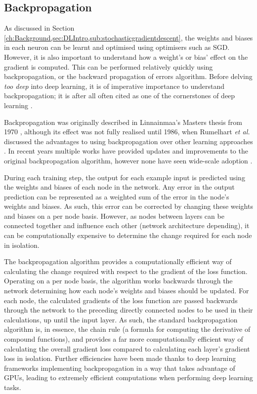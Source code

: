 \subsection{Backpropagation}\label{ch:Background,sec:DLIntro,sub:backprop}

As discussed in Section \ref{ch:Background,sec:DLIntro,sub:stochasticgradientdescent}, the weights and biases in each neuron can be learnt and optimised using optimisers such as SGD. However, it is also important to understand how a weight's or bias' effect on the gradient is computed. This can be performed relatively quickly using backpropagation, or the backward propagation of errors algorithm. Before delving \textit{too deep} into deep learning, it is of imperative importance to understand backpropagation; it is after all often cited as one of the cornerstones of deep learning \cite{alber_backprop_2018}.

Backpropagation was originally described in Linnainmaa's Masters thesis from 1970 \cite{linnainmaa_representation_1970}, although its effect was not fully realised until 1986, when Rumelhart \textit{et al.} discussed the advantages to using backpropagation over other learning approaches \cite{rumelhart_learning_1986}. In recent years multiple works have provided updates and improvements to the original backpropagation algorithm, however none have seen wide-scale adoption \cite{bengio_use_1994, lillicrap_random_2014, lee_difference_2015, nokland_direct_2016, liao_how_2016}. 

During each training step, the output for each example input is predicted using the weights and biases of each node in the network. Any error in the output prediction can be represented as a weighted sum of the error in the node's weights and biases. As such, this error can be corrected by changing these weights and biases on a per node basis. However, as nodes between layers can be connected together and influence each other (network architecture depending), it can be computationally expensive to determine the change required for each node in isolation.

The backpropagation algorithm provides a computationally efficient way of calculating the change required with respect to the gradient of the loss function. Operating on a per node basis, the algorithm works backwards through the network determining how each node's weights and biases should be updated. For each node, the calculated gradients of the loss function are passed backwards through the network to the preceding directly connected nodes to be used in their calculations, up until the input layer. As such, the standard backpropagation algorithm is, in essence, the chain rule (a formula for computing the derivative of compound functions), and provides a far more computationally efficient way of calculating the overall gradient loss compared to calculating each layer's gradient loss in isolation. Further efficiencies have been made thanks to deep learning frameworks implementing backpropagation in a way that takes advantage of GPUs, leading to extremely efficient computations when performing deep learning tasks.

